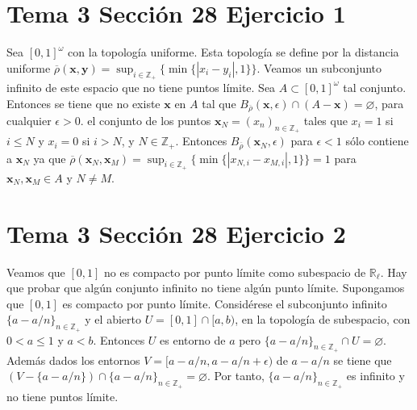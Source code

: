\documentclass{article}
\newcommand{\vect}[1]{\boldsymbol{#1}}
\begin{document}
\section{Tema 3 Sección 28 Ejercicio 1}
Sea $[0,1]^\omega$ con la topología uniforme. Esta topología se define por la distancia uniforme $\overline{\rho}(\vect{x},\vect{y})=\sup_{i\in \mathbb{Z}_+}\{\min\{|x_i-y_i|,1\}\}$. Veamos un subconjunto infinito de este espacio que no tiene puntos límite. Sea $A\subset [0,1]^\omega$ tal conjunto. Entonces se tiene que no existe $\vect{x}$ en $A$ tal que $B_{\overline{\rho}}(\vect{x},\epsilon)\cap (A-\vect{x})=\varnothing$, para cualquier $\epsilon>0$. el conjunto de los puntos $\vect{x}_N=(x_n)_{n\in \mathbb{Z}_+}$ tales que $x_i=1$ si $i\leq N$ y $x_i=0$ si $i>N$, y $N\in \mathbb{Z}_+$. Entonces $B_{\overline{\rho}}(\vect{x}_N,\epsilon)$ para $\epsilon<1$ sólo contiene a $\vect{x}_N$ ya que $\overline{\rho}(\vect{x}_N,\vect{x}_M)=\sup_{i\in \mathbb{Z}_+}\{\min\{|x_{N,i}-x_{M,i}|,1\}\}=1$ para $\vect{x}_N,\vect{x}_M\in A$ y $N\neq M$.
\section{Tema 3 Sección 28 Ejercicio 2}
Veamos que $[0,1]$ no es compacto por punto límite como subespacio de $\mathbb{R}_\ell$. Hay que probar que algún conjunto infinito no tiene algún punto límite. Supongamos que $[0,1]$ es compacto por punto límite. Considérese el subconjunto infinito $\{a-a/n\}_{n\in \mathbb{Z}_+}$ y el abierto $U=[0,1] \cap [a,b)$, en la topología de subespacio, con $0<a\leq 1$ y $a<b$. Entonces $U$ es entorno de $a$ pero $\{a-a/n\}_{n\in \mathbb{Z}_+}\cap U=\varnothing$. Además dados los entornos $V=[a-a/n,a-a/n+\epsilon)$ de $a-a/n$ se tiene que $(V-\{a-a/n\})\cap \{a-a/n\}_{n\in \mathbb{Z}_+}=\varnothing$.  Por tanto, $\{a-a/n\}_{n\in \mathbb{Z}_+}$ es infinito y no tiene puntos límite.
\end{document}
